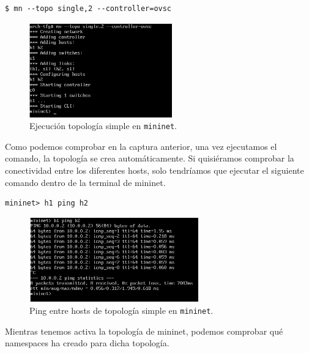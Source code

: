 \documentclass[a4paper, oneside, 12pt]{book}
\begin{document}
	\begin{verbatim}
$ mn --topo single,2 --controller=ovsc
	\end{verbatim}

	\begin{figure}[h!]
		\begin{center}
			\includegraphics[width=0.55\textwidth]{img/mn_single_1.png}
			\caption{Ejecución topología simple en \texttt{mininet}.}
		\end{center}
	\end{figure}

	\pagebreak
	
	\noindent Como podemos comprobar en la captura anterior, una vez ejecutamos el comando, la topología se crea automáticamente. Si quisiéramos comprobar la conectividad entre los diferentes hosts, solo tendríamos que ejecutar el siguiente comando dentro de la terminal de mininet.
	
	\begin{verbatim}
mininet> h1 ping h2
	\end{verbatim}

	\begin{figure}[h!]
		\begin{center}
			\includegraphics[width=0.65\textwidth]{img/mn_single_2.png}
			\caption{Ping entre hosts de topología simple en \texttt{mininet}.}
			\label{img: ping mn simple}
		\end{center}
	\end{figure}

	
	\noindent Mientras tenemos activa la topología de mininet, podemos comprobar qué namespaces ha creado para dicha topología. 
	
\end{document}
